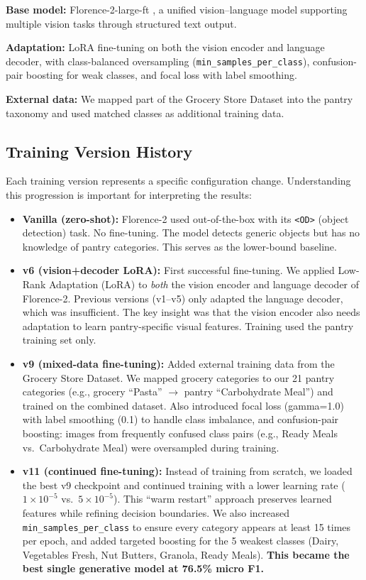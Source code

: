 \documentclass[11pt]{article}
\begin{document}
\textbf{Base model:} Florence-2-large-ft \cite{xiao2023florence2}, a unified vision--language model supporting multiple vision tasks through structured text output.

\textbf{Adaptation:} LoRA fine-tuning on both the vision encoder and language decoder, with class-balanced oversampling (\texttt{min\_samples\_per\_class}), confusion-pair boosting for weak classes, and focal loss with label smoothing.

\textbf{External data:} We mapped part of the Grocery Store Dataset \cite{klasson2019grocery} into the pantry taxonomy and used matched classes as additional training data.

\subsection{Training Version History}

Each training version represents a specific configuration change. Understanding this progression is important for interpreting the results:

\begin{itemize}[leftmargin=1.5em]
  \item \textbf{Vanilla (zero-shot):} Florence-2 used out-of-the-box with its \texttt{<OD>} (object detection) task. No fine-tuning. The model detects generic objects but has no knowledge of pantry categories. This serves as the lower-bound baseline.
  
  \item \textbf{v6 (vision+decoder LoRA):} First successful fine-tuning. We applied Low-Rank Adaptation (LoRA) to \textit{both} the vision encoder and language decoder of Florence-2. Previous versions (v1--v5) only adapted the language decoder, which was insufficient. The key insight was that the vision encoder also needs adaptation to learn pantry-specific visual features. Training used the pantry training set only.
  
  \item \textbf{v9 (mixed-data fine-tuning):} Added external training data from the Grocery Store Dataset. We mapped grocery categories to our 21 pantry categories (e.g., grocery ``Pasta'' $\rightarrow$ pantry ``Carbohydrate Meal'') and trained on the combined dataset. Also introduced focal loss (gamma=1.0) with label smoothing (0.1) to handle class imbalance, and confusion-pair boosting: images from frequently confused class pairs (e.g., Ready Meals vs.\ Carbohydrate Meal) were oversampled during training.
  
  \item \textbf{v11 (continued fine-tuning):} Instead of training from scratch, we loaded the best v9 checkpoint and continued training with a lower learning rate ($1 \times 10^{-5}$ vs.\ $5 \times 10^{-5}$). This ``warm restart'' approach preserves learned features while refining decision boundaries. We also increased \texttt{min\_samples\_per\_class} to ensure every category appears at least 15 times per epoch, and added targeted boosting for the 5 weakest classes (Dairy, Vegetables Fresh, Nut Butters, Granola, Ready Meals). \textbf{This became the best single generative model at 76.5\% micro F1.}
\end{itemize}
\end{document}
